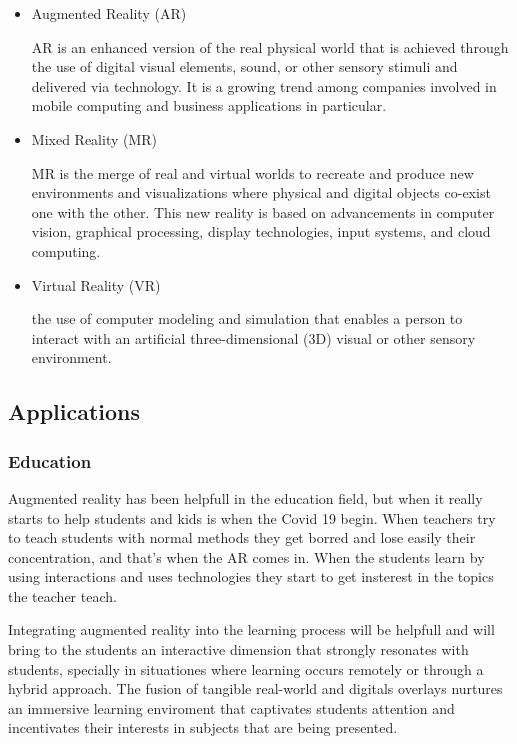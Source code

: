 \documentclass[twoside]{article}
\begin{document}
\begin{itemize}
    \item{Augmented Reality (AR)}

        AR is an enhanced version of the real physical world that is achieved through the use of digital visual elements, sound, or other sensory stimuli and delivered via technology. It is a growing trend among companies involved in mobile computing and business applications in particular. 


    \item{Mixed Reality (MR)}

        MR is the merge of real and virtual worlds to recreate and produce new environments and visualizations where physical and digital objects co-exist one with the other.
        This new reality is based on advancements in computer vision, graphical processing, display technologies, input systems, and cloud computing.

    \item{Virtual Reality (VR)}

        the use of computer modeling and simulation that enables a person to interact with an artificial three-dimensional (3D) visual or other sensory environment.

\end{itemize}
\subsection{Applications}
\subsubsection{Education}
Augmented reality has been helpfull in the education field, but when it really starts to help students and kids is when the Covid 19 begin. When teachers try to teach students with normal methods they get borred and lose easily their concentration, and that's when the AR comes in. When the students learn by using interactions and uses technologies they start to get insterest in the topics the teacher teach.

Integrating augmented reality into the learning process will be helpfull and will bring to the students an interactive dimension that strongly resonates with students, specially in situationes where learning occurs remotely or through a hybrid approach. The fusion of tangible real-world and digitals overlays nurtures an immersive learning enviroment that captivates students attention and incentivates their interests in subjects that are being presented.
\end{document}
